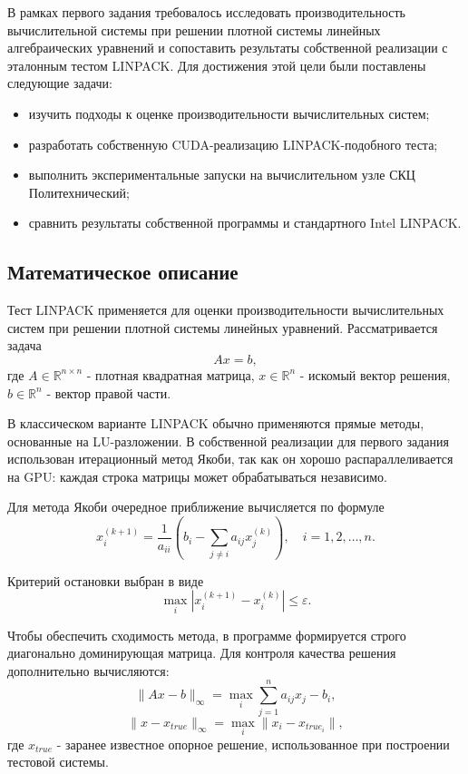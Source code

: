 \documentclass[areasetadvanced]{scrartcl}
\begin{document}
В рамках первого задания требовалось исследовать производительность вычислительной системы при решении плотной системы линейных алгебраических
уравнений и сопоставить результаты собственной реализации с эталонным тестом
LINPACK. Для достижения этой цели были поставлены следующие задачи:
\begin{itemize}
\item изучить подходы к оценке производительности вычислительных систем;
\item разработать собственную CUDA-реализацию LINPACK-подобного теста;
\item выполнить экспериментальные запуски на вычислительном узле СКЦ Политехнический;
\item сравнить результаты собственной программы и стандартного Intel LINPACK.
\end{itemize}

\subsection{Математическое описание}

Тест LINPACK применяется для оценки производительности вычислительных систем при решении плотной системы линейных уравнений. Рассматривается задача
\begin{equation}
    A x = b,
\end{equation}
где $A \in \mathbb{R}^{n \times n}$ - плотная квадратная матрица, $x \in \mathbb{R}^{n}$ - искомый вектор решения, $b \in \mathbb{R}^{n}$ - вектор правой части.

В классическом варианте LINPACK обычно применяются прямые методы, основанные на LU-разложении. В собственной реализации для первого задания использован итерационный метод Якоби, так как он хорошо распараллеливается на GPU: каждая строка матрицы может обрабатываться независимо.

Для метода Якоби очередное приближение вычисляется по формуле
\begin{equation}
    x_i^{(k+1)} = \frac{1}{a_{ii}} \left( b_i - \sum\limits_{j \ne i} a_{ij} x_j^{(k)} \right), \quad i = 1, 2, \dots, n.
\end{equation}

Критерий остановки выбран в виде
\begin{equation}
    \max_i \left| x_i^{(k+1)} - x_i^{(k)} \right| \le \varepsilon.
\end{equation}

Чтобы обеспечить сходимость метода, в программе формируется строго диагонально доминирующая матрица. Для контроля качества решения дополнительно вычисляются:
\begin{equation}
    \| A x - b \|_{\infty} = \max_i \sum_{j = 1}^n a_{ij} x_j - b_i,
\end{equation}
\begin{equation}
    \| x - x_{true} \|_{\infty} = \max_i \| x_i - x_{true_i} \|,
\end{equation}
где $x_{true}$ - заранее известное опорное решение, использованное при построении тестовой системы.
\end{document}
